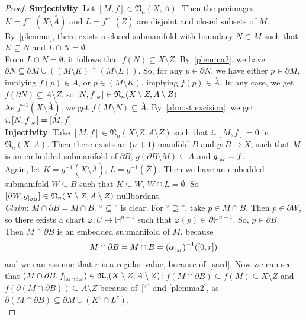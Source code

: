 \documentclass[a4paper,11pt]{article}
\begin{document}
\begin{proof}
    \textbf{Surjectivity}: Let \([M,f]\in\mathfrak{N}_n(X,A)\). Then the preimages \(K=f^{-1}(X\setminus\overset{\circ}A)\) and \(L=f^{-1}(\overline{Z})\) are disjoint and closed subsets of \(M\). By\ \ref{plemma}, there exists a closed submanifold with boundary \(N\subset M\) such that \(K\subseteq N\) and \(L\cap N=\emptyset\).\\
    From \(L\cap N=\emptyset\), it follows that \(f(N)\subseteq X\setminus\overline{Z}\). By\ \ref{plemma2}, we have \(\partial N\subseteq \partial M\cup((M\setminus K)\cap(M\setminus L))\). So, for any \(p\in \partial N\), we have either \(p\in\partial M\), implying \(f(p)\in A\), or \(p\in(M\setminus K)\), implying \(f(p)\in\overset{\circ}A\). In any case, we get \(f(\partial N)\subseteq A\setminus\overline{Z}\), so \([N, f_{|_{N}}]\in\mathfrak{N}_n(X\setminus Z,A\setminus Z)\).\\
    As \(f^{-1}(X\setminus\overset{\circ}A)\), we get \(f(M\setminus N)\subseteq \overset{\circ}A\). By\ \ref{almost excision}, we get \(i_\ast[N,f_{|_{N}}]=[M,f]\)\\
    \textbf{Injectivity}: Take \([M,f]\in\mathfrak{N}_n(X\setminus Z, A\setminus Z)\) such that \(i_\ast[M,f]=0\) in \(\mathfrak{N}_n(X,A)\). Then there exists an (\(n+1\))-manifold \(B\) and \(g:B\to X\), such that \(M\) is an embedded submanifold of \(\partial B\), \(g(\partial B\setminus M)\subseteq A\) and \(g_{|_{M}}=f\).\\
    Again, let \(K=g^{-1}(X\setminus\overset{\circ}A)\), \(L=g^{-1}(\overline{Z})\). Then we have an embedded submanifold \(W\subseteq B\) such that \(K\subseteq W\), \(W\cap L=\emptyset\). So \([\partial W,g_{|_{\partial B}}]\in\mathfrak{N}_n(X\setminus Z, A\setminus Z)\) nullbordant.\\
    \emph{Claim}: \(M\cap\partial B=M\cap B\). \enquote{\(\subseteq\)} is clear. For \enquote{\(\supseteq\)}, take \(p\in M\cap B\). Then \(p\in\partial W\), so there exists a chart \(\varphi:U\to\mathbb{H}^{n+1}\) such that \(\varphi(p)\in\partial\mathbb{H}^{n+1}\). So, \(p\in\partial B\).\\
    Then \(M\cap\partial B\) is an embedded submanifold of \(M\), because
    \begin{equation}\label{*}
        M\cap\partial B= M\cap B={(\alpha_{|_{M}})}^{-1}([0,r])
    \end{equation}
    and we can assume that \(r\) is a regular value, because of\ \ref{sard}. Now we can see that \((M\cap\partial B,f_{|_{M\cap\partial B}})\in\mathfrak{N}_n(X\setminus Z,A\setminus Z)\): \(f(M\cap\partial B)\subseteq f(M)\subseteq X\setminus Z\) and \(f(\partial(M\cap\partial B))\subseteq A\setminus Z\) because of\ \ref{*} and \ref{plemma2}, as \(\partial(M\cap\partial B)\subseteq\partial M\cup(K^c\cap L^c)\).\\

\end{proof}
\end{document}
